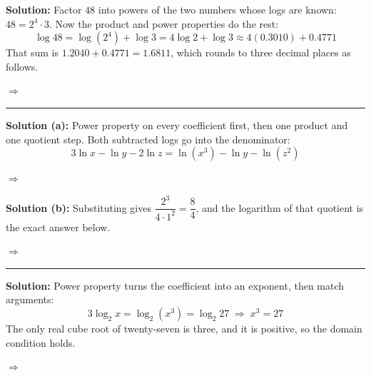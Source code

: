\documentclass[12pt]{article}
\begin{document}

\textbf{Solution:} Factor $48$ into powers of the two numbers whose logs are known: $48 = 2^4 \cdot 3$. Now the product and power properties do the rest:
\[ \log 48 = \log(2^4) + \log 3 = 4\log 2 + \log 3 \approx 4(0.3010) + 0.4771 \]
That sum is $1.2040 + 0.4771 = 1.6811$, which rounds to three decimal places as follows.

$\Rightarrow$ 

\vspace{0.15cm}\noindent\rule{\linewidth}{0.2pt}


\textbf{Solution (a):} Power property on every coefficient first, then one product and one quotient step. Both subtracted logs go into the denominator:
\[ 3\ln x - \ln y - 2\ln z = \ln(x^3) - \ln y - \ln(z^2) \]

$\Rightarrow$ 

\textbf{Solution (b):} Substituting gives $\dfrac{2^3}{4 \cdot 1^2} = \dfrac{8}{4}$, and the logarithm of that quotient is the exact answer below.

$\Rightarrow$ 

\vspace{0.15cm}\noindent\rule{\linewidth}{0.2pt}


\textbf{Solution:} Power property turns the coefficient into an exponent, then match arguments:
\[ 3\log_2 x = \log_2(x^3) = \log_2 27 \;\Longrightarrow\; x^3 = 27 \]
The only real cube root of twenty-seven is three, and it is positive, so the domain condition holds.

$\Rightarrow$ 
\end{document}
